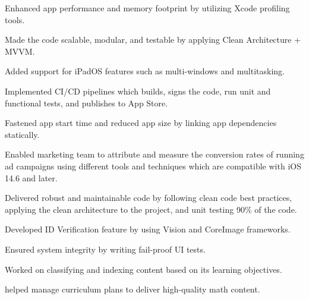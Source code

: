 \documentclass[]{deedy-resume-openfont}
\begin{document}
\begin{minipage}[t]{1\textwidth}
\begin{tightemize}
\item Enhanced app performance and memory footprint by utilizing Xcode profiling tools.
\item Made the code scalable, modular, and testable by applying Clean Architecture + MVVM.
\item Added support for iPadOS features such as multi-windows and multitasking.
\item Implemented CI/CD pipelines which builds, signs the code, run unit and functional tests, and publishes to App Store.
\item Fastened app start time and reduced app size by linking app dependencies statically.
\item Enabled marketing team to attribute and measure the conversion rates of running ad campaigns using different tools and techniques which are compatible with iOS 14.6 and later.
\end{tightemize}
\sectionsep


\vspace{\topsep} %
\begin{tightemize}
\item Delivered robust and maintainable code by following clean code best practices, applying the clean architecture to the project, and unit testing 90\% of the code.
\item Developed ID Verification feature by using Vision and CoreImage frameworks.
\item Ensured system integrity by writing fail-proof UI tests.
\end{tightemize}
\sectionsep

\vspace{\topsep}
\begin{tightemize}
\item Worked on classifying and indexing content based on its learning objectives.
\item helped manage curriculum plans to deliver high-quality math content.
\end{tightemize}
\sectionsep

%
%

\end{minipage} 
\end{document}
